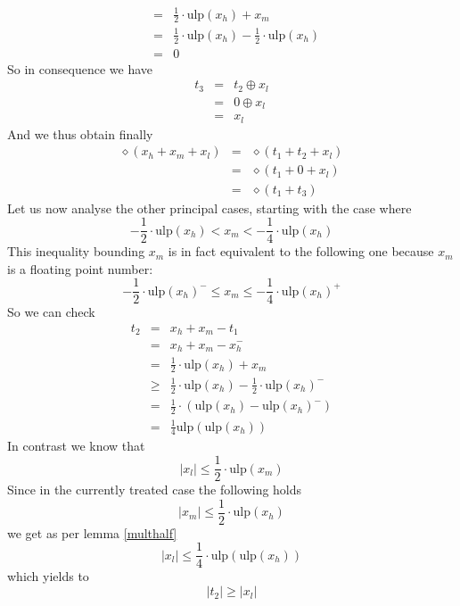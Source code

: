 \documentclass[a4paper,10pt,twoside]{article}
\newenvironment{proof}[1][Proof]{\begin{trivlist}
\item[\hskip \labelsep {\bfseries #1}]}{\end{trivlist}}
\newcommand{\hi}{\ensuremath{\mathit{h}}}
\newcommand{\mi}{\ensuremath{\mathit{m}}}
\newcommand{\lo}{\ensuremath{\mathit{l}}}
\newcommand{\mUlp}{\ensuremath{\mathrm{ulp}}}
\begin{document}
\begin{proof}
\begin{eqnarray*}
& = & \frac{1}{2} \cdot \mUlp\left( x_\hi \right) + x_\mi \\
& = & \frac{1}{2} \cdot \mUlp\left( x_\hi \right) - \frac{1}{2} \cdot \mUlp\left( x_\hi \right) \\
& = & 0
\end{eqnarray*}
So in consequence we have
\begin{eqnarray*}
t_3 & = & t_2 \oplus x_\lo \\
& = & 0 \oplus x_\lo \\
& = & x_\lo
\end{eqnarray*}
And we thus obtain finally
\begin{eqnarray*}
\diamond \left( x_\hi + x_\mi + x_\lo \right) & = & \diamond \left( t_1 + t_2 + x_\lo \right) \\
& = & \diamond \left( t_1 + 0 + x_\lo \right) \\
& = & \diamond \left( t_1 + t_3 \right)
\end{eqnarray*}
Let us now analyse the other principal cases, starting with the case where
$$-\frac{1}{2} \cdot \mUlp\left( x_\hi \right) < x_\mi < -\frac{1}{4} \cdot \mUlp\left( x_\hi \right)$$
This inequality bounding $x_\mi$ is in fact equivalent to the following one because $x_\mi$ is a floating point number:
$$-\frac{1}{2} \cdot \mUlp\left( x_\hi \right)^- \leq x_\mi \leq -\frac{1}{4} \cdot \mUlp\left( x_\hi \right)^+$$
So we can check
\begin{eqnarray*}
t_2 & = & x_\hi + x_\mi - t_1 \\
& = & x_\hi + x_\mi - x_\hi^- \\
& = & \frac{1}{2} \cdot \mUlp\left( x_\hi \right) + x_\mi \\
& \geq & \frac{1}{2} \cdot \mUlp\left( x_\hi \right) - \frac{1}{2} \cdot \mUlp\left( x_\hi \right)^- \\
& = & \frac{1}{2} \cdot \left( \mUlp\left( x_\hi \right) - \mUlp\left( x_\hi \right)^- \right) \\
& = & \frac{1}{4} \mUlp\left( \mUlp\left( x_\hi \right) \right)
\end{eqnarray*}
In contrast we know that
$$\left \vert x_\lo \right \vert \leq \frac{1}{2} \cdot \mUlp \left( x_\mi \right)$$
Since in the currently treated case the following holds
$$\left \vert x_\mi \right \vert \leq \frac{1}{2} \cdot \mUlp\left( x_\hi \right)$$
we get as per lemma \ref{multhalf}
$$\left \vert x_\lo \right \vert \leq \frac{1}{4} \cdot \mUlp\left( \mUlp\left( x_\hi \right) \right)$$
which yields to
$$\left \vert t_2 \right \vert \geq \left \vert x_\lo \right \vert$$

\end{proof}
\end{document}
